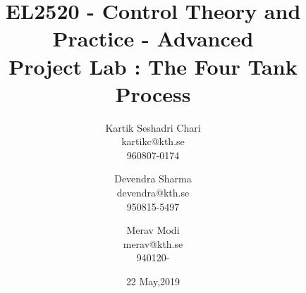 \documentclass[10pt,a4paper, twocolumn]{article}
\title{\LARGE \bf
EL2520 - Control Theory and Practice - Advanced \\
Project Lab : The Four Tank Process
}
\author{
Kartik Seshadri Chari \\
kartikc@kth.se \\
960807-0174 
\and
Devendra Sharma\\
devendra@kth.se\\
950815-5497
\and
Merav Modi\\
merav@kth.se\\
940120-}
\date{22 May,2019}
\renewenvironment{abstract}{\bf \textit{Abstract} ---}
\begin{document}
\renewcommand{\thesection}{\Roman{section}.}		%
\renewcommand{\thesubsection}{\Alph{subsection}.}	%
\sectionfont{\normalfont}				%
\subsectionfont{\normalfont\itshape}	%
\setcounter{secnumdepth}{2}  %

\maketitle

\begin{abstract}
This document is a report for the Project Lab conducted under the EL2520 course. This project was divided into 2 distinct sessions. The first one involved deriving a physical model of a four-tank process for minimum phase and non-minimum phase configurations via experimentation and investigating the coupling between the tanks. Emphasis was also given to manually controlling the process to understand the performance limitations due to the non-minimum dynamics. The second instance was dedicated to testing the model-based decentralized PI controller and the robust Glover-McFarlane method.
\end{abstract}
\end{document}
